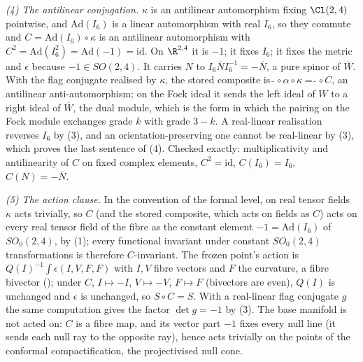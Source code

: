\emph{(4) The antilinear conjugation.} $\kappa$ is an antilinear automorphism fixing $\Cl(2,4)$ pointwise, and $\mathrm{Ad}(I_6)$ is a linear automorphism with real $I_6$, so they commute and $C = \mathrm{Ad}(I_6)\circ\kappa$ is an antilinear automorphism with $C^2 = \mathrm{Ad}(I_6^2) = \mathrm{Ad}(-1) = \mathrm{id}$. On $\R^{2,4}$ it is $-1$; it fixes $I_6$; it fixes the metric and $\epsilon$ because $-1 \in SO(2,4)$. It carries $N$ to $I_6 \overline N I_6^{-1} = -\overline N$, a pure spinor of $\overline W$. With the flag conjugate realised by $\kappa$, the stored composite is $\widetilde{\ }\circ\alpha\circ\kappa = \widetilde{\ }\circ C$, an antilinear anti-automorphism; on the Fock ideal it sends the left ideal of $W$ to a right ideal of $\overline W$, the dual module, which is the form in which the pairing on the Fock module exchanges grade $k$ with grade $3-k$. A real-linear realisation reverses $I_6$ by (3), and an orientation-preserving one cannot be real-linear by (3), which proves the last sentence of (4). Checked exactly: multiplicativity and antilinearity of $C$ on fixed complex elements, $C^2 = \mathrm{id}$, $C(I_6) = I_6$, $C(N) = -\overline N$.

\emph{(5) The action clause.} In the convention of the formal level, on real tensor fields $\kappa$ acts trivially, so $C$ (and the stored composite, which acts on fields as $C$) acts on every real tensor field of the fibre as the constant element $-1 = \mathrm{Ad}(I_6)$ of $SO_0(2,4)$, by (1); every functional invariant under constant $SO_0(2,4)$ transformations is therefore $C$-invariant. The frozen point's action is $Q(I)^{-1}\int \epsilon(I,V,F,F)$ with $I, V$ fibre vectors and $F$ the curvature, a fibre bivector (); under $C$, $I \mapsto -I$, $V \mapsto -V$, $F \mapsto F$ (bivectors are even), $Q(I)$ is unchanged and $\epsilon$ is unchanged, so $S \circ C = S$. With a real-linear flag conjugate $g$ the same computation gives the factor $\det g = -1$ by (3). The base manifold is not acted on: $C$ is a fibre map, and its vector part $-1$ fixes every null line (it sends each null ray to the opposite ray), hence acts trivially on the points of the conformal compactification, the projectivised null cone.

